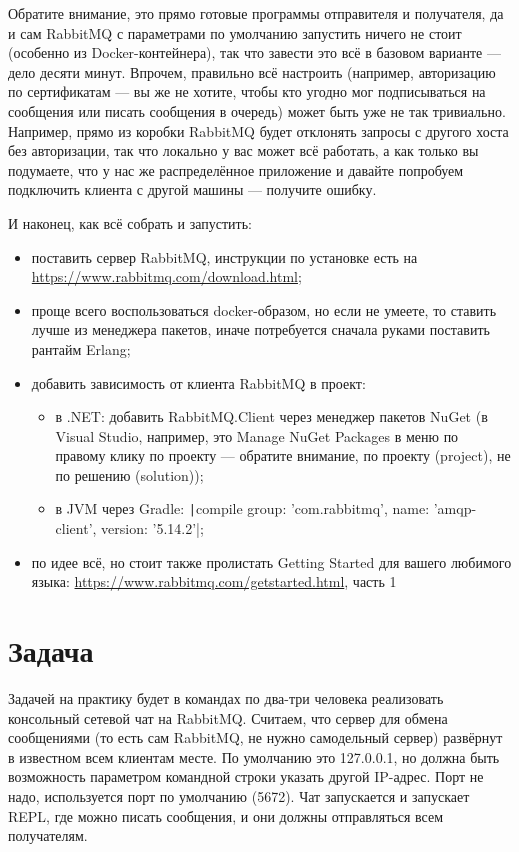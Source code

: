 \documentclass[a5paper]{article}
\begin{document}
Обратите внимание, это прямо готовые программы отправителя и получателя, да и сам RabbitMQ с параметрами по умолчанию запустить ничего не стоит (особенно из Docker-контейнера), так что завести это всё в базовом варианте --- дело десяти минут. Впрочем, правильно всё настроить (например, авторизацию по сертификатам --- вы же не хотите, чтобы кто угодно мог подписываться на сообщения или писать сообщения в очередь) может быть уже не так тривиально. Например, прямо из коробки RabbitMQ будет отклонять запросы с другого хоста без авторизации, так что локально у вас может всё работать, а как только вы подумаете, что у нас же распределённое приложение и давайте попробуем подключить клиента с другой машины --- получите ошибку.

И наконец, как всё собрать и запустить:

\begin{itemize}
    \item поставить сервер RabbitMQ, инструкции по установке есть на \url{https://www.rabbitmq.com/download.html};
    \item проще всего воспользоваться docker-образом, но если не умеете, то ставить лучше из менеджера пакетов, иначе потребуется сначала руками поставить рантайм Erlang;
    \item добавить зависимость от клиента RabbitMQ в проект:
    \begin{itemize}
        \item в .NET: добавить RabbitMQ.Client через менеджер пакетов NuGet (в Visual Studio, например, это Manage NuGet Packages в меню по правому клику по проекту --- обратите внимание, по проекту (project), не по решению (solution));
        \item в JVM через Gradle: \texttt|compile group: 'com.rabbitmq', name: 'amqp-client', version: '5.14.2'|;
    \end{itemize}
    \item по идее всё, но стоит также пролистать Getting Started для вашего любимого языка: \url{https://www.rabbitmq.com/getstarted.html}, часть 1
\end{itemize}

\section{Задача}

Задачей на практику будет в командах по два-три человека реализовать консольный сетевой чат на RabbitMQ. Считаем, что сервер для обмена сообщениями (то есть сам RabbitMQ, не нужно самодельный сервер) развёрнут в известном всем клиентам месте. По умолчанию это 127.0.0.1, но должна быть возможность параметром командной строки указать другой IP-адрес. Порт не надо, используется порт по умолчанию (5672). Чат запускается и запускает REPL, где можно писать сообщения, и они должны отправляться всем получателям.
\end{document}
